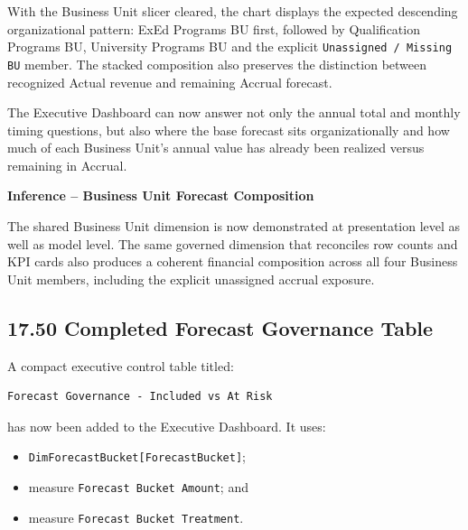 \documentclass[11pt,a4paper]{article}
\begin{document}
With the Business Unit slicer cleared, the chart displays the expected descending
organizational pattern: ExEd Programs BU first, followed by Qualification Programs
BU, University Programs BU and the explicit \texttt{Unassigned / Missing BU}
member. The stacked composition also preserves the distinction between recognized
Actual revenue and remaining Accrual forecast.

\begin{successbox}

\textbf{\color{SuccessGreen}{Business Unit Composition Result}}

The Executive Dashboard can now answer not only the annual total and monthly timing
questions, but also where the base forecast sits organizationally and how much of
each Business Unit's annual value has already been realized versus remaining in
Accrual.

\end{successbox}

\begin{inferencebox}

\textbf{Inference -- Business Unit Forecast Composition}

The shared Business Unit dimension is now demonstrated at presentation level as
well as model level. The same governed dimension that reconciles row counts and KPI
cards also produces a coherent financial composition across all four Business Unit
members, including the explicit unassigned accrual exposure.

\end{inferencebox}


\subsection{17.50 Completed Forecast Governance Table}

A compact executive control table titled:

\begin{lstlisting}[style=powerquery]
Forecast Governance - Included vs At Risk
\end{lstlisting}

has now been added to the Executive Dashboard. It uses:

\begin{itemize}[leftmargin=7mm,itemsep=2pt]
    \item \texttt{DimForecastBucket[ForecastBucket]};
    \item measure \texttt{Forecast Bucket Amount}; and
    \item measure \texttt{Forecast Bucket Treatment}.
\end{itemize}
\end{document}
